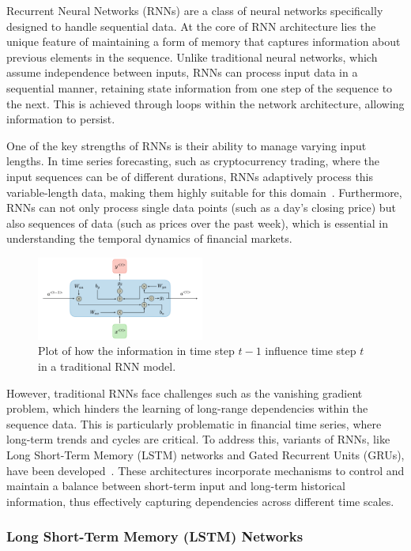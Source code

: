 \documentclass[10pt,twocolumn,letterpaper]{article}
\begin{document}
Recurrent Neural Networks (RNNs) are a class of neural networks specifically designed to handle sequential data. At the core of RNN architecture lies the unique feature of maintaining a form of memory that captures information about previous elements in the sequence. Unlike traditional neural networks, which assume independence between inputs, RNNs can process input data in a sequential manner, retaining state information from one step of the sequence to the next. This is achieved through loops within the network architecture, allowing information to persist.

One of the key strengths of RNNs is their ability to manage varying input lengths. In time series forecasting, such as cryptocurrency trading, where the input sequences can be of different durations, RNNs adaptively process this variable-length data, making them highly suitable for this domain~\cite{HochreiterSchmidhuber}. Furthermore, RNNs can not only process single data points (such as a day's closing price) but also sequences of data (such as prices over the past week), which is essential in understanding the temporal dynamics of financial markets.

\begin{figure}[htbp]
   \centering
   \includegraphics[width=0.49\textwidth]{Fig/2.png}
   \caption{Plot of how the information in time step $t-1$ influence time step $t$ in a traditional RNN model.} \label{fig2}
\end{figure}

However, traditional RNNs face challenges such as the vanishing gradient problem, which hinders the learning of long-range dependencies within the sequence data. This is particularly problematic in financial time series, where long-term trends and cycles are critical. To address this, variants of RNNs, like Long Short-Term Memory (LSTM) networks and Gated Recurrent Units (GRUs), have been developed~\cite{FuzzyInferenceLSTM}. These architectures incorporate mechanisms to control and maintain a balance between short-term input and long-term historical information, thus effectively capturing dependencies across different time scales.

\subsubsection{Long Short-Term Memory (LSTM) Networks}
\end{document}
